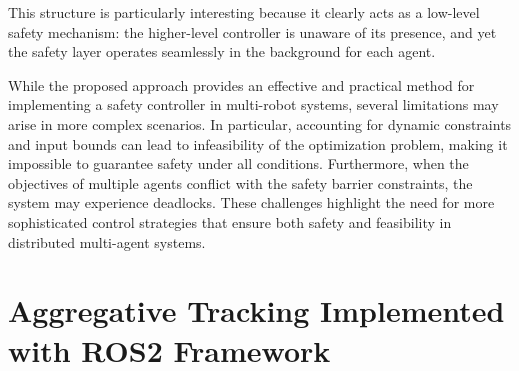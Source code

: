 This structure is particularly interesting because it clearly acts as a low-level safety mechanism: the higher-level controller is unaware of its presence, and yet the safety layer operates seamlessly in the background for each agent.

\medskip
While the proposed approach provides an effective and practical method for implementing a safety controller in multi-robot systems, several limitations may arise in more complex scenarios. In particular, accounting for dynamic constraints and input bounds can lead to infeasibility of the optimization problem, making it impossible to guarantee safety under all conditions. Furthermore, when the objectives of multiple agents conflict with the safety barrier constraints, the system may experience deadlocks. These challenges highlight the need for more sophisticated control strategies that ensure both safety and feasibility in distributed multi-agent systems.

\newpage

\section{Aggregative Tracking Implemented with ROS2 Framework}

